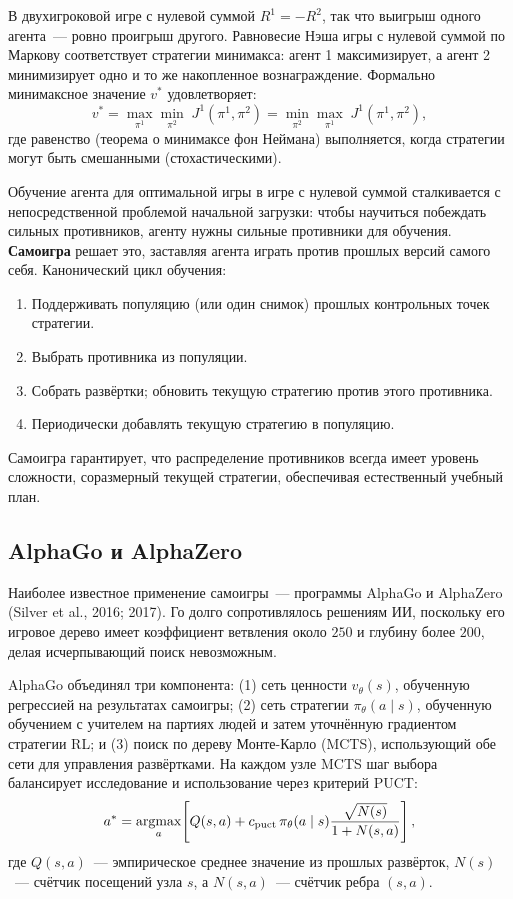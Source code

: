 В двухигроковой игре с нулевой суммой $R^1 = -R^2$, так что выигрыш одного агента~---
ровно проигрыш другого. Равновесие Нэша игры с нулевой суммой по Маркову
соответствует стратегии минимакса: агент 1 максимизирует, а агент
2 минимизирует одно и то же накопленное вознаграждение. Формально минимаксное значение
$v^*$ удовлетворяет:
\[
  v^* = \max_{\pi^1} \min_{\pi^2}\; J^1(\pi^1, \pi^2)
       = \min_{\pi^2} \max_{\pi^1}\; J^1(\pi^1, \pi^2),
\]
где равенство (теорема о минимаксе фон Неймана)
выполняется, когда стратегии могут быть смешанными (стохастическими).

Обучение агента для оптимальной игры в игре с нулевой суммой сталкивается с
непосредственной проблемой начальной загрузки: чтобы научиться побеждать сильных противников,
агенту нужны сильные противники для обучения. \textbf{Самоигра}
 решает это, заставляя агента играть против
прошлых версий самого себя. Канонический цикл обучения:
\begin{enumerate}[leftmargin=*]
  \item Поддерживать популяцию (или один снимок) прошлых контрольных точек стратегии.
  \item Выбрать противника из популяции.
  \item Собрать развёртки; обновить текущую стратегию против этого
    противника.
  \item Периодически добавлять текущую стратегию в популяцию.
\end{enumerate}
Самоигра гарантирует, что распределение противников всегда имеет
уровень сложности, соразмерный текущей стратегии, обеспечивая
естественный учебный план.

\subsection{AlphaGo и AlphaZero}

Наиболее известное применение самоигры~--- программы AlphaGo и
AlphaZero (Silver et al., 2016;
2017). Го долго сопротивлялось решениям ИИ, поскольку его
игровое дерево имеет коэффициент ветвления около $250$ и глубину более
$200$, делая исчерпывающий поиск невозможным.

AlphaGo объединял три компонента: (1) сеть ценности $v_\theta(s)$,
обученную регрессией на результатах самоигры; (2) сеть стратегии
$\pi_\theta(a \mid s)$, обученную обучением с учителем на партиях людей
и затем уточнённую градиентом стратегии RL; и (3) поиск по дереву Монте-Карло
(MCTS), использующий обе сети для управления развёртками.
На каждом узле MCTS шаг выбора балансирует исследование и
использование через критерий PUCT:
\begin{equation}
\label{eq:puct}
a^* = \operatorname*{argmax}_{a}\!\left[
  Q(s, a) + c_\mathrm{puct}\, \pi_\theta(a \mid s)
  \frac{\sqrt{N(s)}}{1 + N(s, a)}
\right],
\end{equation}
где $Q(s,a)$~--- эмпирическое среднее значение из прошлых развёрток,
$N(s)$~--- счётчик посещений узла $s$, а $N(s,a)$~--- счётчик
ребра $(s,a)$.

